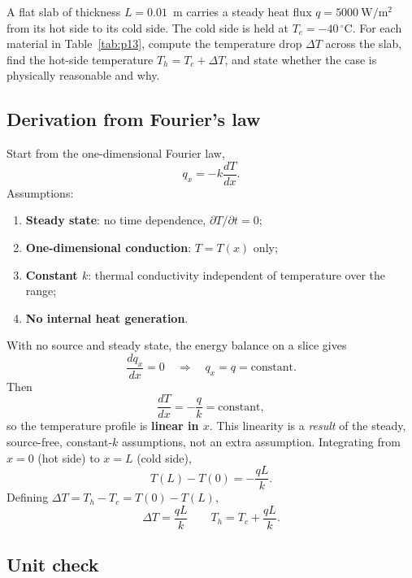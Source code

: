 \documentclass[reprint, amsmath, amssymb, aps, prl]{revtex4-2}
\newcommand{\degC}{\ensuremath{\,^\circ\mathrm{C}}}
\begin{document}
A flat slab of thickness $L=0.01$~m carries a steady heat flux $q=5000~\mathrm{W/m^2}$
from its hot side to its cold side. The cold side is held at $T_c=-40\degC$. For each
material in Table~\ref{tab:p13}, compute the temperature drop $\Delta T$ across the slab,
find the hot-side temperature $T_h=T_c+\Delta T$, and state whether the case is
physically reasonable and why.

\subsection*{Derivation from Fourier's law}

Start from the one-dimensional Fourier law,
\begin{equation*}
q_x=-k\frac{dT}{dx}.
\end{equation*}
Assumptions:
\begin{enumerate}
\item \textbf{Steady state}: no time dependence, $\partial T/\partial t=0$;
\item \textbf{One-dimensional conduction}: $T=T(x)$ only;
\item \textbf{Constant $k$}: thermal conductivity independent of temperature over the range;
\item \textbf{No internal heat generation}.
\end{enumerate}
With no source and steady state, the energy balance on a slice gives
\begin{equation*}
\frac{dq_x}{dx}=0\quad\Longrightarrow\quad q_x=q=\text{constant}.
\end{equation*}
Then
\begin{equation*}
\frac{dT}{dx}=-\frac{q}{k}=\text{constant},
\end{equation*}
so the temperature profile is \textbf{linear in $x$}. This linearity is a \emph{result} of
the steady, source-free, constant-$k$ assumptions, not an extra assumption. Integrating
from $x=0$ (hot side) to $x=L$ (cold side),
\begin{equation*}
T(L)-T(0)=-\frac{qL}{k}.
\end{equation*}
Defining $\Delta T=T_h-T_c=T(0)-T(L)$,
\begin{equation*}
\boxed{\Delta T=\frac{qL}{k}}
\qquad
\boxed{T_h=T_c+\frac{qL}{k}}.
\end{equation*}

\subsection*{Unit check}
\end{document}
